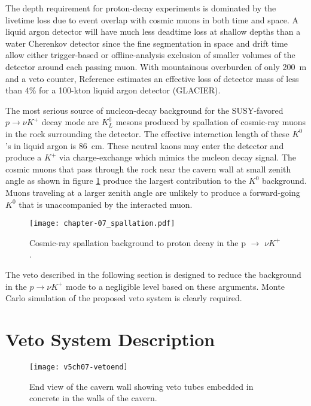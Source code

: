The depth requirement for proton-decay experiments is dominated by the livetime loss due to event overlap with cosmic muons in both time and space.  A liquid argon detector will have much less deadtime loss at shallow depths than a water Cherenkov detector since the fine segmentation in space and drift time allow either trigger-based or offline-analysis exclusion of smaller volumes of the detector around each passing muon. With mountainous overburden of only 200~m and a veto counter, Reference \cite{bueno-pdk} estimates an effective loss of detector mass of less than 4\% for a 100-kton liquid argon detector (GLACIER). 

The most serious source of nucleon-decay background for the SUSY-favored $p \rightarrow \nu K^+$ decay mode are $K^0_L$ mesons produced by spallation of cosmic-ray muons in the rock surrounding the detector. The effective interaction length of these $K^0$'s in liquid argon is 86~cm. These neutral kaons may enter the detector and produce a $K^+$ via charge-exchange which mimics the nucleon decay signal.  The cosmic muons that pass through the rock near the cavern wall at small zenith angle as shown in figure \ref{fig:spallation} produce the largest contribution to the $K^0$ background. Muons traveling at a larger zenith angle are unlikely to produce a forward-going $K^0$ that is unaccompanied by the interacted muon.

\begin{figure}[h]
\centering
\texttt{[image: chapter-07\_spallation.pdf]}
\caption{Cosmic-ray spallation background to proton decay in the p $\rightarrow$ $\nu K^+$.}
\label{fig:spallation}
\end{figure}

The veto described in the following section is designed to reduce the background in the $p \rightarrow \nu K^+$ mode to a negligible level based on these arguments. Monte Carlo simulation of the proposed veto system is clearly required.

\section{Veto System Description}

\begin{figure}[h]
\centering
\texttt{[image: v5ch07-vetoend]}
\caption{End view of the cavern wall showing veto tubes embedded in concrete in the walls of the cavern.}
\label{fig:vetoend}
\end{figure}

